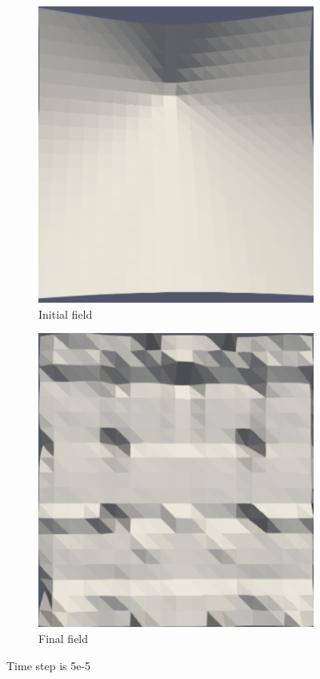 \documentclass{article}
\begin{document}
\begin{figure}[hbt!]
  \begin{subfigure}{0.5\textwidth}
        \centering
        \includegraphics[width=\textwidth]{Figures/5e-5 20x20/for n 1.png}
        \caption{Initial field}
  \end{subfigure}
  \hfill
  \begin{subfigure}{0.4\textwidth}
        \centering
        \includegraphics[width=\textwidth]{Figures/5e-5 20x20/for n 20.png}
        \caption{Final field}
  \end{subfigure}
  \caption{Time step is 5e-5}
  \label{t2m1_1} 
\end{figure}
\end{document}
